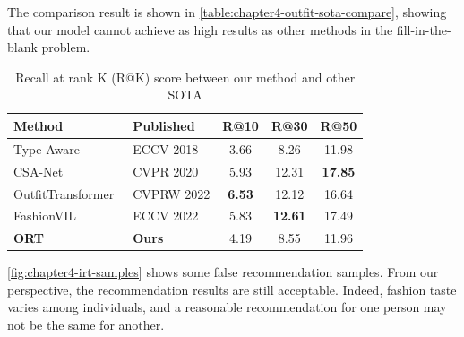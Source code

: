 The comparison result is shown in \autoref{table:chapter4-outfit-sota-compare}, showing that our model cannot achieve as high results as other methods in the fill-in-the-blank problem. 

\begin{table}[ht!]
\centering
\begin{tabular}{l l c c c}
\hline
 Method & Published                                & R@10        & R@30         & R@50         \\ \hline
Type-Aware~\cite{Mariya-ECCV18-Learning} & ECCV 2018         & 3.66          & 8.26           & 11.98          \\
CSA-Net~\cite{Lin-CVPR2020-Fashion} & CVPR 2020            & 5.93          & 12.31          & \textbf{17.85} \\
OutfitTransformer~\cite{Sarkar-CVPRW2022-OutfitTransformer}  & CVPRW 2022 & \textbf{6.53} & 12.12          & 16.64          \\ 
FashionVIL~\cite{Han-ECCV2022-FashionViL} & ECCV 2022        & 5.83          & \textbf{12.61} & 17.49          \\ \hline
\textbf{ORT}   & \textbf{Ours}                          & 4.19          & 8.55           & 11.96          \\ \hline
\end{tabular}
\caption{Recall at rank K (R@K) score between our method and other SOTA}
\label{table:chapter4-outfit-sota-compare}
\end{table}

\autoref{fig:chapter4-irt-samples} shows some false recommendation samples. From our perspective, the recommendation results are still acceptable. Indeed, fashion taste varies among individuals, and a reasonable recommendation for one person may not be the same for another. 

